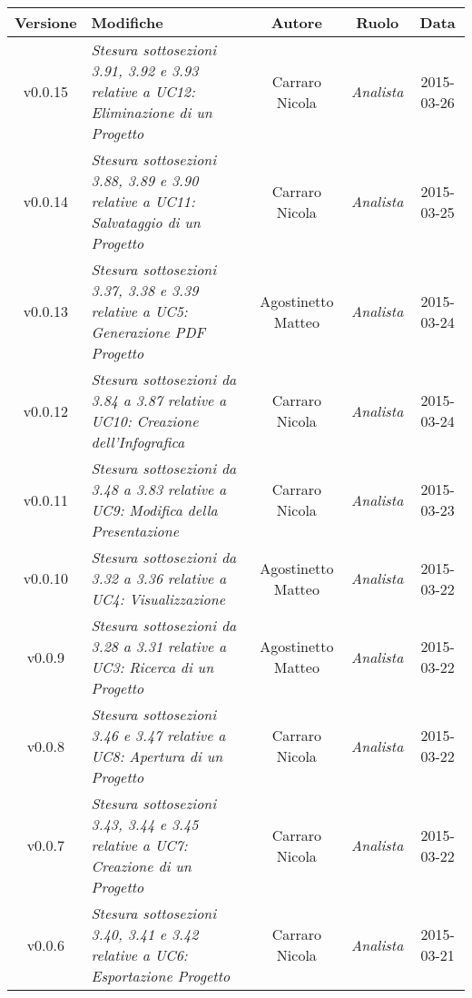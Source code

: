 \newpage
\begin{table}[h]
\centering
\begin{tabular}{|c|p{}|c|c|c|}
	\toprule
		\textbf{Versione} & \textbf{Modifiche} & \textbf{Autore} & \textbf{Ruolo} & \textbf{Data}\\
	\midrule
	\midrule
		v0.0.15 & \textit{Stesura sottosezioni 3.91, 3.92 e 3.93 relative a UC12: Eliminazione di un Progetto} & Carraro Nicola & \textit{Analista} & 2015-03-26\\
	\midrule
		v0.0.14 & \textit{Stesura sottosezioni 3.88, 3.89 e 3.90 relative a UC11: Salvataggio di un Progetto} & Carraro Nicola & \textit{Analista} & 2015-03-25\\
	\midrule
		v0.0.13 & \textit{Stesura sottosezioni 3.37, 3.38 e 3.39 relative a UC5: Generazione PDF Progetto} & Agostinetto Matteo & \textit{Analista} & 2015-03-24\\
	\midrule
		v0.0.12 & \textit{Stesura sottosezioni da 3.84 a 3.87 relative a UC10: Creazione dell'Infografica} & Carraro Nicola & \textit{Analista} & 2015-03-24\\
	\midrule
		v0.0.11 & \textit{Stesura sottosezioni da 3.48 a 3.83 relative a UC9: Modifica della Presentazione} & Carraro Nicola & \textit{Analista} & 2015-03-23\\
	\midrule
		v0.0.10 & \textit{Stesura sottosezioni da 3.32 a 3.36 relative a UC4: Visualizzazione} & Agostinetto Matteo & \textit{Analista} & 2015-03-22\\
	\midrule
		v0.0.9 & \textit{Stesura sottosezioni da 3.28 a 3.31 relative a UC3: Ricerca di un Progetto} & Agostinetto Matteo & \textit{Analista} & 2015-03-22\\
	\midrule
		v0.0.8 & \textit{Stesura sottosezioni 3.46 e 3.47 relative a UC8: Apertura di un Progetto} & Carraro Nicola & \textit{Analista} & 2015-03-22\\
	\midrule
		v0.0.7 & \textit{Stesura sottosezioni 3.43, 3.44 e 3.45 relative a UC7: Creazione di un Progetto} & Carraro Nicola & \textit{Analista} & 2015-03-22\\
	\midrule
		v0.0.6 & \textit{Stesura sottosezioni 3.40, 3.41 e 3.42 relative a UC6: Esportazione Progetto} & Carraro Nicola & \textit{Analista} & 2015-03-21\\
	\bottomrule
\end{tabular}
\end{table}
\newpage
